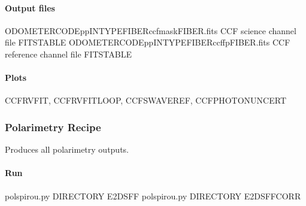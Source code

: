 \documentclass[a4paper,10pt,english]{report}
\begin{document}
\paragraph{Output files}
\label{\detokenize{user/spirou/recipes/ccf:output-files}}
\begin{sphinxVerbatim}[commandchars=\\\{\}]
ODOMETER\PYGZus{}CODE\PYGZus{}pp\PYGZus{}INTYPE\PYGZus{}FIBER\PYGZus{}ccf\PYGZus{}mask\PYGZus{}FIBER.fits   CCF  science channel file FITS\PYGZhy{}TABLE
ODOMETER\PYGZus{}CODE\PYGZus{}pp\PYGZus{}INTYPE\PYGZus{}FIBER\PYGZus{}ccf\PYGZus{}fp\PYGZus{}FIBER.fits       CCF  reference channel file FITS\PYGZhy{}TABLE
\end{sphinxVerbatim}


\paragraph{Plots}
\label{\detokenize{user/spirou/recipes/ccf:plots}}
\begin{sphinxVerbatim}[commandchars=\\\{\}]
CCF\PYGZus{}RV\PYGZus{}FIT, CCF\PYGZus{}RV\PYGZus{}FIT\PYGZus{}LOOP, CCF\PYGZus{}SWAVE\PYGZus{}REF, CCF\PYGZus{}PHOTON\PYGZus{}UNCERT
\end{sphinxVerbatim}


\subsubsection{Polarimetry Recipe}
\label{\detokenize{user/spirou/recipes/polar:polarimetry-recipe}}\label{\detokenize{user/spirou/recipes/polar:recipes-spirou-polar}}\label{\detokenize{user/spirou/recipes/polar::doc}}
Produces all polarimetry outputs.


\paragraph{Run}
\label{\detokenize{user/spirou/recipes/polar:run}}
\begin{sphinxVerbatim}[commandchars=\\\{\}]
pol\PYGZus{}spirou.py \PYG{o}{[}DIRECTORY\PYG{o}{]} \PYG{o}{[}E2DSFF\PYG{o}{]}
pol\PYGZus{}spirou.py \PYG{o}{[}DIRECTORY\PYG{o}{]} \PYG{o}{[}E2DSFF\PYGZus{}CORR\PYG{o}{]}
\end{sphinxVerbatim}
\end{document}
